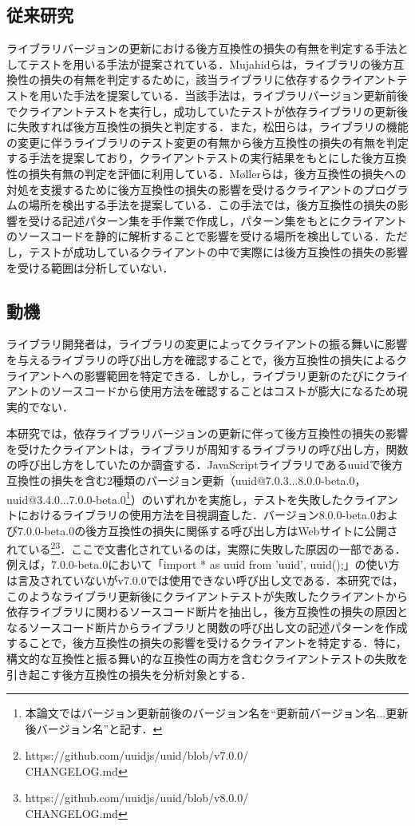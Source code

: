 \documentclass[T,J]{fose} %
\begin{document}
\subsection{従来研究}
ライブラリバージョンの更新における後方互換性の損失の有無を判定する手法としてテストを用いる手法が提案されている\cite{mujahid}\cite{matsuda}．Mujahidらは，ライブラリの後方互換性の損失の有無を判定するために，該当ライブラリに依存するクライアントテストを用いた手法を提案している\cite{mujahid}．当該手法は，ライブラリバージョン更新前後でクライアントテストを実行し，成功していたテストが依存ライブラリの更新後に失敗すれば後方互換性の損失と判定する．また，松田らは，ライブラリの機能の変更に伴うライブラリのテスト変更の有無から後方互換性の損失の有無を判定する手法を提案しており，クライアントテストの実行結果をもとにした後方互換性の損失有無の判定を評価に利用している\cite{matsuda}．M{\o}llerらは，後方互換性の損失への対処を支援するために後方互換性の損失の影響を受けるクライアントのプログラムの場所を検出する手法を提案している\cite{10.1145/3428255}．この手法では，後方互換性の損失の影響を受ける記述パターン集を手作業で作成し，パターン集をもとにクライアントのソースコードを静的に解析することで影響を受ける場所を検出している．ただし，テストが成功しているクライアントの中で実際には後方互換性の損失の影響を受ける範囲は分析していない．


\subsection{動機}
ライブラリ開発者は，ライブラリの変更によってクライアントの振る舞いに影響を与えるライブラリの呼び出し方を確認することで，後方互換性の損失によるクライアントへの影響範囲を特定できる．しかし，ライブラリ更新のたびにクライアントのソースコードから使用方法を確認することはコストが膨大になるため現実的でない．


本研究では，依存ライブラリバージョンの更新に伴って後方互換性の損失の影響を受けたクライアントは，ライブラリが周知するライブラリの呼び出し方，関数の呼び出し方をしていたのか調査する．JavaScriptライブラリであるuuidで後方互換性の損失を含む2種類のバージョン更新（uuid@7.0.3...8.0.0-beta.0，uuid@3.4.0...7.0.0-beta.0\footnote{本論文ではバージョン更新前後のバージョン名を``更新前バージョン名...更新後バージョン名''と記す．}）のいずれかを実施し，テストを失敗したクライアントにおけるライブラリの使用方法を目視調査した．バージョン8.0.0-beta.0および7.0.0-beta.0の後方互換性の損失に関係する呼び出し方はWebサイトに公開されている\footnote{https://github.com/uuidjs/uuid/blob/v7.0.0/\\CHANGELOG.md}\footnote{https://github.com/uuidjs/uuid/blob/v8.0.0/\\CHANGELOG.md}．ここで文書化されているのは，実際に失敗した原因の一部である．例えば，7.0.0-beta.0において「import * as uuid from 'uuid', uuid();」の使い方は言及されていないがv7.0.0では使用できない呼び出し文である．本研究では，このようなライブラリ更新後にクライアントテストが失敗したクライアントから依存ライブラリに関わるソースコード断片を抽出し，後方互換性の損失の原因となるソースコード断片からライブラリと関数の呼び出し文の記述パターンを作成することで，後方互換性の損失の影響を受けるクライアントを特定する．特に，構文的な互換性と振る舞い的な互換性の両方を含むクライアントテストの失敗を引き起こす後方互換性の損失を分析対象とする．
\end{document}
